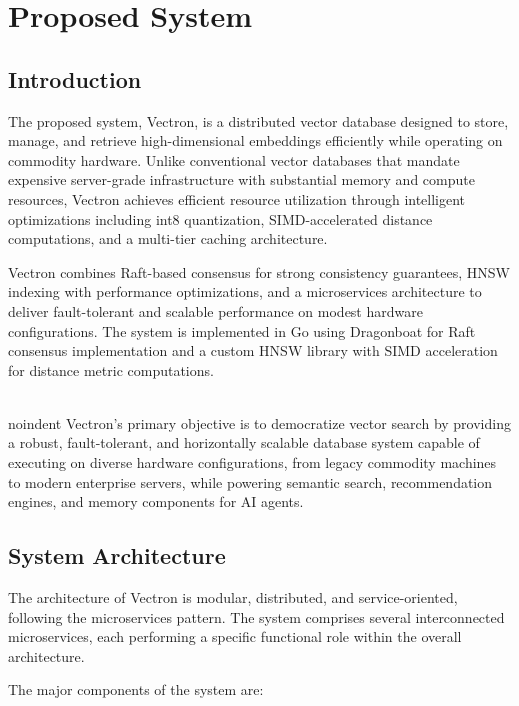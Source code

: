 \chapter{Proposed System}

\section{Introduction}
\noindent The proposed system, Vectron, is a distributed vector database designed to store, manage, and retrieve high-dimensional embeddings efficiently while operating on commodity hardware. Unlike conventional vector databases that mandate expensive server-grade infrastructure with substantial memory and compute resources, Vectron achieves efficient resource utilization through intelligent optimizations including int8 quantization, SIMD-accelerated distance computations, and a multi-tier caching architecture.

\noindent Vectron combines Raft-based consensus for strong consistency guarantees, HNSW indexing with performance optimizations, and a microservices architecture to deliver fault-tolerant and scalable performance on modest hardware configurations. The system is implemented in Go using Dragonboat for Raft consensus implementation and a custom HNSW library with SIMD acceleration for distance metric computations.

\\noindent Vectron's primary objective is to democratize vector search by providing a robust, fault-tolerant, and horizontally scalable database system capable of executing on diverse hardware configurations, from legacy commodity machines to modern enterprise servers, while powering semantic search, recommendation engines, and memory components for AI agents.

\section{System Architecture}

The architecture of Vectron is modular, distributed, and service-oriented, following the microservices pattern. The system comprises several interconnected microservices, each performing a specific functional role within the overall architecture.

\noindent The major components of the system are:

